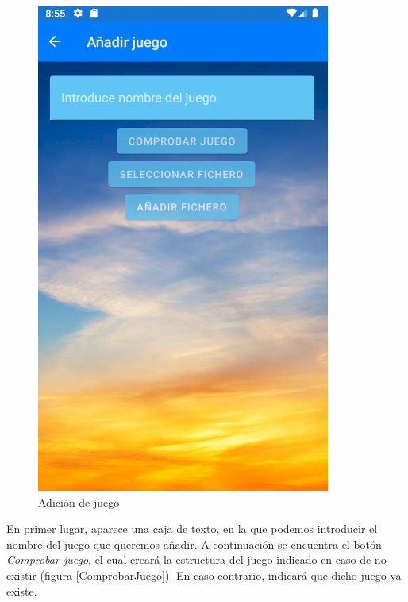 \begin{figure}[H]
    \centering
    \includegraphics[scale=0.3]{Figures/Capturas/AnadirJuego.png}
    \caption{Adición de juego}
    \label{AnadirJuego}    
\end{figure}

En primer lugar, aparece una caja de texto, en la que podemos introducir el nombre del juego que queremos añadir.
A continuación se encuentra el botón \textit{Comprobar juego}, el cual creará la estructura del juego indicado en caso 
de no existir (figura \ref*{ComprobarJuego}). En caso contrario, indicará que dicho juego ya existe. 

